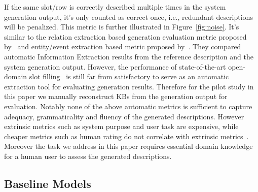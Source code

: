 \documentclass[11pt,a4paper]{article}
\begin{document}
If the same slot/row is correctly described multiple times in the system generation output, it's only counted as correct once, i.e., redundant descriptions will be penalized. 
This metric is further illustrated in Figure~\ref{fig:noise}. It's similar to the relation extraction based generation evaluation metric proposed by~\cite{data2docu17} and entity/event extraction based metric proposed by~\cite{Whitehead18,Lu18imagecaption}. They compared automatic Information Extraction results from the reference description and the system generation output. However, the performance of state-of-the-art open-domain slot filling~\cite{wu2010open,fader2011identifying,min2012ensemble,xu2013open,angeli2015leveraging, bhutani2016nested,Yu2017} is still far from satisfactory to serve as an automatic extraction tool for evaluating generation results. Therefore for the pilot study in this paper we manually reconstruct KBs from the generation output for evaluation. Notably none of the above automatic metrics is sufficient to capture adequacy, grammaticality and fluency of the generated descriptions. However extrinsic metrics such as system purpose and user task are expensive, while cheaper metrics such as human rating do not correlate with extrinsic metrics~\cite{Gkatzia2015}. Moreover the task we address in this paper requires essential domain knowledge for a human user to assess the generated descriptions. 
































%
 \subsection{Baseline Models}
\end{document}
